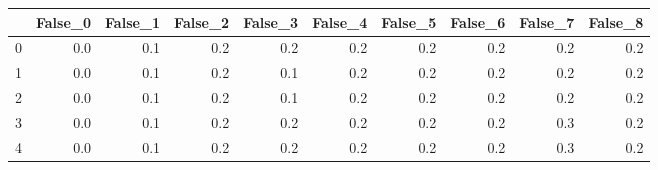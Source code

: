 \begin{tabular}{lrrrrrrrrr}
\toprule
{} &  False\_0 &  False\_1 &  False\_2 &  False\_3 &  False\_4 &  False\_5 &  False\_6 &  False\_7 &  False\_8 \\ \hline
\midrule
0 &      0.0 &      0.1 &      0.2 &      0.2 &      0.2 &      0.2 &      0.2 &      0.2 &      0.2 \\ \hline
1 &      0.0 &      0.1 &      0.2 &      0.1 &      0.2 &      0.2 &      0.2 &      0.2 &      0.2 \\ \hline
2 &      0.0 &      0.1 &      0.2 &      0.1 &      0.2 &      0.2 &      0.2 &      0.2 &      0.2 \\ \hline
3 &      0.0 &      0.1 &      0.2 &      0.2 &      0.2 &      0.2 &      0.2 &      0.3 &      0.2 \\ \hline
4 &      0.0 &      0.1 &      0.2 &      0.2 &      0.2 &      0.2 &      0.2 &      0.3 &      0.2 \\ \hline
\bottomrule
\end{tabular}
